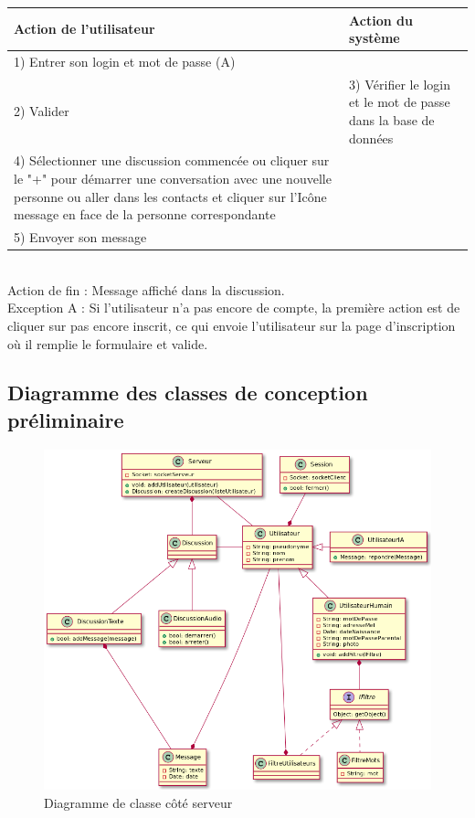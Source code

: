 \documentclass[a4paper,12pt]{article}
\begin{document}
	\begin{tabular}{|p{7cm}|p{7cm}|}
		\hline
		Action de l'utilisateur & Action du système\tabularnewline
		\hline

		\hline
		1) Entrer son login et mot de passe (A)  & \tabularnewline

		\hline
		2) Valider  & 3) Vérifier le login et le mot de passe dans la base de données\tabularnewline

		\hline
		4) Sélectionner une discussion commencée ou cliquer sur le "+" pour	démarrer une conversation avec une nouvelle personne ou aller dans les contacts et cliquer sur l’Icône message en face de la personne correspondante & \tabularnewline

		\hline
		5) Envoyer son message  & \tabularnewline
		\hline
	\end{tabular}

~\\

	Action de fin  : Message affiché dans la discussion. \\

	Exception A : Si l'utilisateur n'a pas encore de compte, la première action est de cliquer sur pas encore inscrit, ce qui envoie l'utilisateur sur la page d'inscription où il remplie le formulaire et valide.

	\subsection{Diagramme des classes de conception préliminaire}
	\begin{figure}[H]
		\centerline{\includegraphics[width=16.5cm]{../diagrammes/img/classesServeur.png}}
		\caption{Diagramme de classe côté serveur}
	\end{figure}
\end{document}
